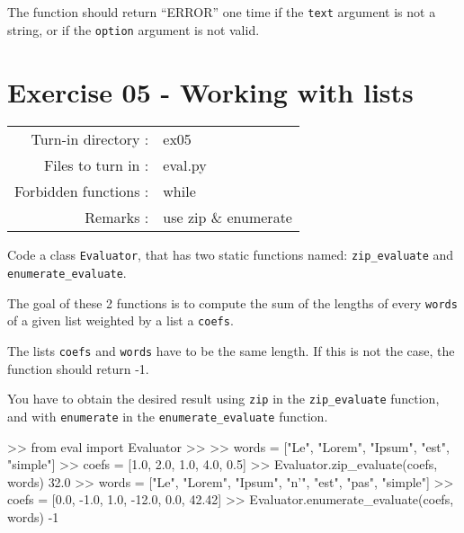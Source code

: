 \documentclass[]{article}
\newenvironment{Shaded}{\begin{snugshade}}{\end{snugshade}}
\newcommand{\BuiltInTok}[1]{\textcolor[rgb]{0.50,0.55,0.55}{#1}}
\newcommand{\DecValTok}[1]{\textcolor[rgb]{0.96,0.45,0.00}{#1}}
\newcommand{\FloatTok}[1]{\textcolor[rgb]{0.96,0.45,0.00}{#1}}
\newcommand{\ImportTok}[1]{\textcolor[rgb]{0.15,0.68,0.38}{#1}}
\newcommand{\NormalTok}[1]{\textcolor[rgb]{0.81,0.81,0.76}{#1}}
\newcommand{\OperatorTok}[1]{\textcolor[rgb]{0.81,0.81,0.76}{#1}}
\newcommand{\StringTok}[1]{\textcolor[rgb]{0.96,0.31,0.31}{#1}}
\begin{document}
The function should return ``ERROR'' one time if the \texttt{text}
argument is not a string, or if the \texttt{option} argument is not
valid.

\clearpage

\hypertarget{exercise-05---working-with-lists-1}{%
\section{Exercise 05 - Working with
lists}\label{exercise-05---working-with-lists-1}}

\begin{longtable}[]{@{}rl@{}}
\toprule
\endhead
Turn-in directory : & ex05\tabularnewline
Files to turn in : & eval.py\tabularnewline
Forbidden functions : & while\tabularnewline
Remarks : & use zip \& enumerate\tabularnewline
\bottomrule
\end{longtable}

Code a class \texttt{Evaluator}, that has two static functions named:
\texttt{zip\_evaluate} and \texttt{enumerate\_evaluate}.

The goal of these 2 functions is to compute the sum of the lengths of
every \texttt{words} of a given list weighted by a list a
\texttt{coefs}.

The lists \texttt{coefs} and \texttt{words} have to be the same length.
If this is not the case, the function should return -1.

You have to obtain the desired result using \texttt{zip} in the
\texttt{zip\_evaluate} function, and with \texttt{enumerate} in the
\texttt{enumerate\_evaluate} function.

\begin{Shaded}
\begin{Highlighting}[]
\OperatorTok{>>} \ImportTok{from} \BuiltInTok{eval} \ImportTok{import}\NormalTok{ Evaluator}
\OperatorTok{>>} 
\OperatorTok{>>}\NormalTok{ words }\OperatorTok{=}\NormalTok{ [}\StringTok{"Le"}\NormalTok{, }\StringTok{"Lorem"}\NormalTok{, }\StringTok{"Ipsum"}\NormalTok{, }\StringTok{"est"}\NormalTok{, }\StringTok{"simple"}\NormalTok{]}
\OperatorTok{>>}\NormalTok{ coefs }\OperatorTok{=}\NormalTok{ [}\FloatTok{1.0}\NormalTok{, }\FloatTok{2.0}\NormalTok{, }\FloatTok{1.0}\NormalTok{, }\FloatTok{4.0}\NormalTok{, }\FloatTok{0.5}\NormalTok{]}
\OperatorTok{>>}\NormalTok{ Evaluator.zip_evaluate(coefs, words)}
\FloatTok{32.0}
\OperatorTok{>>}\NormalTok{ words }\OperatorTok{=}\NormalTok{ [}\StringTok{"Le"}\NormalTok{, }\StringTok{"Lorem"}\NormalTok{, }\StringTok{"Ipsum"}\NormalTok{, }\StringTok{"n'"}\NormalTok{, }\StringTok{"est"}\NormalTok{, }\StringTok{"pas"}\NormalTok{, }\StringTok{"simple"}\NormalTok{]}
\OperatorTok{>>}\NormalTok{ coefs }\OperatorTok{=}\NormalTok{ [}\FloatTok{0.0}\NormalTok{, }\FloatTok{-1.0}\NormalTok{, }\FloatTok{1.0}\NormalTok{, }\FloatTok{-12.0}\NormalTok{, }\FloatTok{0.0}\NormalTok{, }\FloatTok{42.42}\NormalTok{]}
\OperatorTok{>>}\NormalTok{ Evaluator.enumerate_evaluate(coefs, words)}
\DecValTok{-1}
\end{Highlighting}
\end{Shaded}
\end{document}
